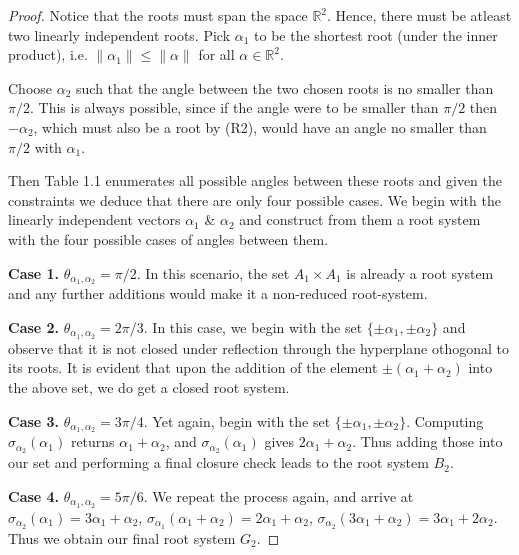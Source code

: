 \begin{proof}
    Notice that the roots must span the space $\mathbb{R}^2$. Hence, there must be atleast two linearly independent roots.
    Pick $\alpha_1$ to be the shortest root (under the inner product), i.e. $\|\alpha_1\| \leq \|\alpha\|$ for all 
    $\alpha \in \mathbb{R}^2$. \newline
    
    Choose $\alpha_2$ such that the angle between the two chosen roots is no smaller than $\pi / 2$.
    This is always possible, since if the angle were to be smaller than $\pi / 2$ then $-\alpha_2$, which must also be a root by (R2),
    would have an angle no smaller than $\pi/2$ with $\alpha_1$. \newline
    
    Then Table 1.1 enumerates all possible angles between these roots and given the constraints we deduce that there are only four
    possible cases. We begin with the linearly independent vectors $\alpha_1$ \& $\alpha_2$ and construct from them a root system
    with the four possible cases of angles between them. \newline

    \textbf{Case 1.} $\theta_{\alpha_1, \alpha_2} = \pi / 2$.
    In this scenario, the set $A_1 \times A_1$ is already a root system and any further additions would make it a
    non-reduced root-system. \newline

    \textbf{Case 2.} $\theta_{\alpha_1, \alpha_2} = 2\pi / 3$.
    In this case, we begin with the set $\{\pm \alpha_1, \pm \alpha_2 \}$ and observe that it is not closed under reflection
    through the hyperplane othogonal to its roots.
    It is evident that upon the addition of the element $\pm (\alpha_1 + \alpha_2)$ into the above set, we do get a
    closed root system. \newline

    \textbf{Case 3.} $\theta_{\alpha_1, \alpha_2} = 3\pi / 4$.
    Yet again, begin with the set $\{\pm \alpha_1, \pm \alpha_2 \}$. Computing $\sigma_{\alpha_2}(\alpha_1)$ returns 
    $\alpha_1 + \alpha_2$, and $\sigma_{\alpha_2}(\alpha_1)$ gives $2\alpha_1 + \alpha_2$. Thus adding those into our set
    and performing a final closure check leads to the root system $B_2$. \newline

    \textbf{Case 4.} $\theta_{\alpha_1, \alpha_2} = 5\pi / 6$.
    We repeat the process again, and arrive at 
        $\sigma_{\alpha_2}(\alpha_1) = 3\alpha_1 + \alpha_2$,
        $\sigma_{\alpha_1}(\alpha_1 + \alpha_2) = 2 \alpha_1 + \alpha_2$,
        $\sigma_{\alpha_2}(3 \alpha_1 + \alpha_2) = 3 \alpha_1 + 2 \alpha_2$.
    Thus we obtain our final root system $G_2$.
\end{proof}